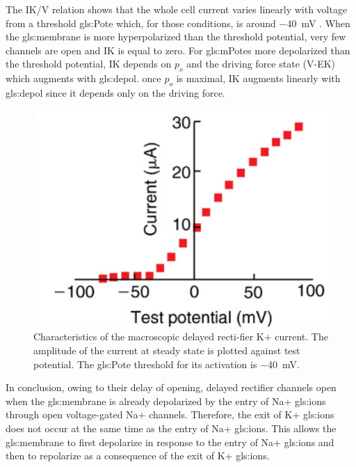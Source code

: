 \documentclass[../../Orator]{subfiles}
\begin{document}
The IK/V relation shows that the whole cell current varies linearly with voltage from a threshold \gls{gls:Pote} which, for those conditions, is around \qty{-40}{\mV} . When the \gls{gls:membrane} is more hyperpolarized than the threshold potential, very few channels are open and IK is equal to zero. For \glspl{gls:mPote} more depolarized than the threshold potential, IK depends on \(p_o\) and the driving force state (V-EK) which augments with \gls{gls:depol}. once \(p_o\) is maximal, IK augments linearly with \gls{gls:depol} since it depends only on the driving force. 
\begin{figure}[H]
    \centering
    \includegraphics[width=0.5\linewidth]{Pictures//Anakin/IK-V.png}
    \caption{Characteristics of the macroscopic delayed recti-fier K+ current.  The amplitude of the current at steady state is plotted against test potential. The \gls{gls:Pote} threshold for its activation is \qty{-40}{\mV}.  }
    \label{fig:enter-label}
\end{figure}
In conclusion, owing to their delay of opening, delayed rectifier channels open when the \gls{gls:membrane} is already depolarized by the entry of Na+ \glspl{gls:ion} through open voltage-gated Na+ channels. Therefore, the exit of K+ \glspl{gls:ion} does not occur at the same time as the entry of Na+ \glspl{gls:ion}. This allows the \gls{gls:membrane} to first depolarize in response to the entry of Na+ \glspl{gls:ion} and then to repolarize as a consequence of the exit of K+ \glspl{gls:ion}.
\end{document}
